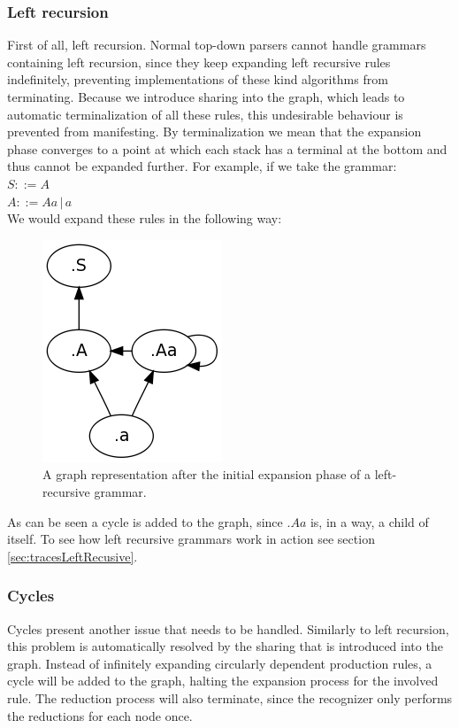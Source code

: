 \documentclass[a4paper,10pt]{article}
\begin{document}
\subsubsection{Left recursion}
First of all, left recursion. Normal top-down parsers cannot handle grammars containing left recursion, since they keep expanding left recursive rules indefinitely, preventing implementations of these kind algorithms from terminating. Because we introduce sharing into the graph, which leads to automatic terminalization of all these rules, this undesirable behaviour is prevented from manifesting. By terminalization we mean that the expansion phase converges to a point at which each stack has a terminal at the bottom and thus cannot be expanded further. For example, if we take the grammar:\\
$S ::= A$\\
$A ::= Aa\,|\,a$\\
We would expand these rules in the following way:
\begin{figure}[H]
\centering
\includegraphics[scale=0.5]{left-recursive.png}
\caption{A graph representation after the initial expansion phase of a left-recursive grammar.}
\end{figure}
As can be seen a cycle is added to the graph, since $.Aa$ is, in a way, a child of itself. To see how left recursive grammars work in action see section \ref{sec:tracesLeftRecusive}.

\subsubsection{Cycles}
Cycles present another issue that needs to be handled. Similarly to left recursion, this problem is automatically resolved by the sharing that is introduced into the graph. Instead of infinitely expanding circularly dependent production rules, a cycle will be added to the graph, halting the expansion process for the involved rule. The reduction process will also terminate, since the recognizer only performs the reductions for each node once.
\end{document}
